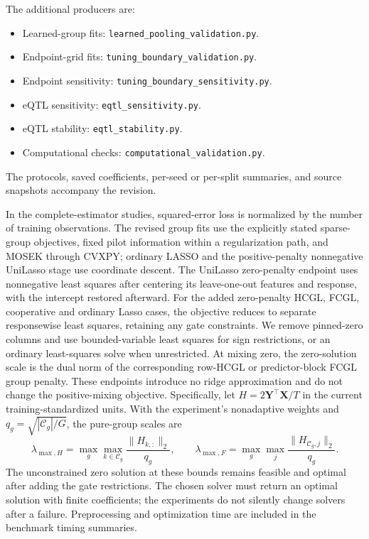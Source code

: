 \documentclass[11pt,a4paper]{article}
\begin{document}
The additional producers are:
\begin{itemize}
\item Learned-group fits: \nolinkurl{learned_pooling_validation.py}.
\item Endpoint-grid fits: \nolinkurl{tuning_boundary_validation.py}.
\item Endpoint sensitivity: \nolinkurl{tuning_boundary_sensitivity.py}.
\item eQTL sensitivity: \nolinkurl{eqtl_sensitivity.py}.
\item eQTL stability: \nolinkurl{eqtl_stability.py}.
\item Computational checks: \nolinkurl{computational_validation.py}.
\end{itemize}
The protocols, saved coefficients,
per-seed or per-split summaries, and source snapshots accompany the revision.

In the complete-estimator studies, squared-error loss is normalized by the
number of training observations.
The revised group fits use the explicitly stated sparse-group objectives,
fixed pilot information within a regularization path, and MOSEK through CVXPY;
ordinary LASSO and the positive-penalty nonnegative UniLasso stage use coordinate
descent. The UniLasso zero-penalty endpoint uses nonnegative least squares
after centering its leave-one-out features and response, with the intercept
restored afterward.
For the added zero-penalty HCGL, FCGL, cooperative and ordinary Lasso cases,
the objective reduces to separate responsewise least squares, retaining any
gate constraints. We remove pinned-zero columns and use bounded-variable least
squares for sign restrictions, or an ordinary least-squares solve when unrestricted.
At mixing zero, the zero-solution scale is the dual norm of the corresponding
row-HCGL or predictor-block FCGL group penalty. These endpoints introduce no
ridge approximation and do not change the positive-mixing objective.
Specifically, let $H=2\bm Y^\top\bm X/T$ in the current training-standardized
units. With the experiment's nonadaptive weights and $q_g=\sqrt{|\mathcal C_g|/G}$,
the pure-group scales are
\[
 \lambda_{\max,H}=\max_g\max_{k\in\mathcal C_g}
       \frac{\|H_{k,:}\|_2}{q_g},\qquad
 \lambda_{\max,F}=\max_g\max_j
       \frac{\|H_{\mathcal C_g,j}\|_2}{q_g}.
\]
The unconstrained zero solution at these bounds remains feasible and optimal
after adding the gate restrictions.
The chosen solver must return an optimal solution with finite coefficients;
the experiments do not silently change solvers after a failure. Preprocessing
and optimization time are included in the benchmark timing summaries.
\end{document}
